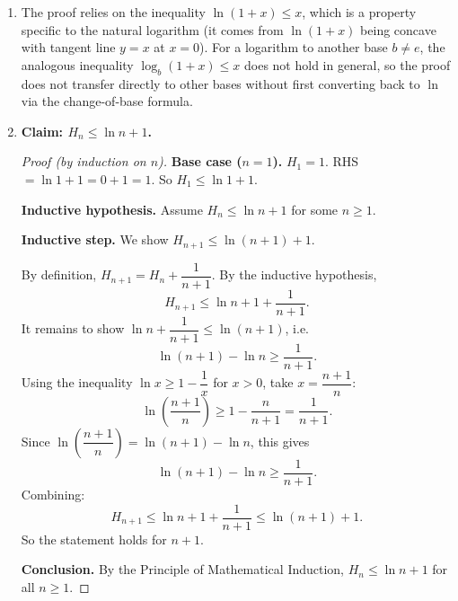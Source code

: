 \documentclass[11pt]{article}
\begin{document}
\begin{solution}
\begin{enumerate}
\item The proof relies on the inequality $\ln(1+x)\le x$, which is a
    property specific to the natural logarithm (it comes from
    $\ln(1+x)$ being concave with tangent line $y=x$ at $x=0$). For a
    logarithm to another base $b\ne e$, the analogous inequality
    $\log_b(1+x)\le x$ does not hold in general, so the proof does
    not transfer directly to other bases without first converting
    back to $\ln$ via the change-of-base formula.

\item \textbf{Claim: $H_n \le \ln n+1$.}
    \begin{proof}[Proof (by induction on $n$)]
        \textbf{Base case ($n=1$).} $H_1=1$. RHS $=\ln1+1=0+1=1$.
        So $H_1\le\ln1+1$.

        \textbf{Inductive hypothesis.} Assume $H_n\le\ln n+1$ for
        some $n\ge1$.

        \textbf{Inductive step.} We show $H_{n+1}\le\ln(n+1)+1$.

        By definition, $H_{n+1}=H_n+\dfrac{1}{n+1}$. By the
        inductive hypothesis,
        \[
            H_{n+1} \le \ln n+1+\frac{1}{n+1}.
        \]
        It remains to show $\ln n+\dfrac{1}{n+1}\le\ln(n+1)$, i.e.
        \[
            \ln(n+1)-\ln n \ge \frac{1}{n+1}.
        \]
        Using the inequality $\ln x \ge 1-\dfrac1x$ for $x>0$, take
        $x=\dfrac{n+1}{n}$:
        \[
            \ln\left(\frac{n+1}{n}\right) \ge 1-\frac{n}{n+1}
            = \frac{1}{n+1}.
        \]
        Since $\ln\left(\dfrac{n+1}{n}\right)=\ln(n+1)-\ln n$, this
        gives
        \[
            \ln(n+1)-\ln n \ge \frac{1}{n+1}.
        \]
        Combining:
        \[
            H_{n+1} \le \ln n+1+\frac{1}{n+1} \le \ln(n+1)+1.
        \]
        So the statement holds for $n+1$.

        \textbf{Conclusion.} By the Principle of Mathematical
        Induction, $H_n \le \ln n+1$ for all $n\ge1$.
    \end{proof}
\end{enumerate}
\end{solution}
\end{document}
